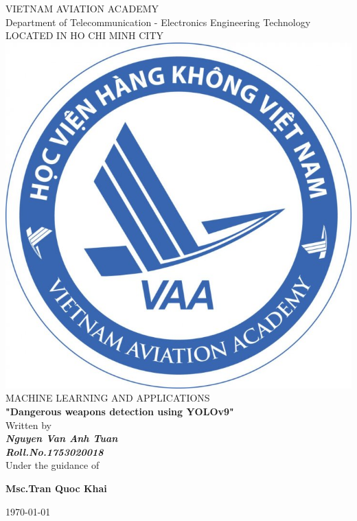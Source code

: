 \documentclass[a4paper,13pt]{report}
\begin{document}
    \begin{titlepage}
        \centering
        
        \LARGE{\textsc{VIETNAM AVIATION ACADEMY}}\\
        \vspace{3mm}
        \normalsize{Department of Telecommunication - Electronics Engineering Technology} \\
        \vspace{3mm}
        \large{LOCATED IN HO CHI MINH CITY} \\
        \vspace{3mm}
        \includegraphics[scale=0.3]{img/logo.png} \\
        \vspace{3mm}
        \Large{MACHINE LEARNING AND APPLICATIONS} \\
        \vspace{10mm}
        \LARGE{\textbf{"Dangerous weapons detection using YOLOv9"}} \\ 
        \vspace{20mm}
        \normalsize{Written by} \\ 
        \vspace{3mm}
        \large{\textbf{\textit{Nguyen Van Anh Tuan}}} \\ 
        \vspace{3mm}
        \large{\textbf{\textit{Roll.No.1753020018}}} \\ 
        \vspace{15mm}
        \large{Under the guidance of} \\
        \vspace{7mm}
        \centerline{\textbf{\large{Msc.Tran Quoc Khai}}}
        \vspace{3.5cm}
        \centerline{\today}
    \end{titlepage}
\end{document}
